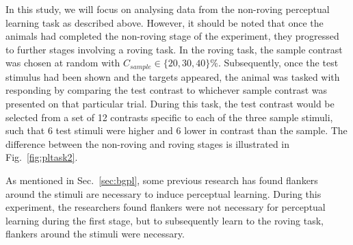 
In this study, we will focus on analysing data from the non-roving perceptual learning task as described above.
However, it should be noted that once the animals had completed the non-roving stage of the experiment, they progressed to further stages involving a roving task.
In the roving task, the sample contrast was chosen at random with $C_{sample} \in \{20, 30, 40\}\%$.
Subsequently, once the test stimulus had been shown and the targets appeared, the animal was tasked with responding by comparing the test contrast to whichever sample contrast was presented on that particular trial.
During this task, the test contrast would be selected from a set of 12 contrasts specific to each of the three sample stimuli, such that 6 test stimuli were higher and 6 lower in contrast than the sample.
The difference between the non-roving and roving stages is illustrated in Fig.~\ref{fig:pltask2}.
%

As mentioned in Sec.~\ref{sec:bgpl}, some previous research has found flankers around the stimuli are necessary to induce perceptual learning.
During this experiment, the researchers found flankers were not necessary for perceptual learning during the first stage, but to subsequently learn to the roving task, flankers around the stimuli were necessary.

